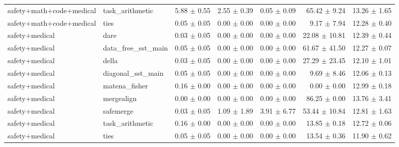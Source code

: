 \begin{table}[H]
{\begin{tabular}{llrrrrr}
safety+math+code+medical & task\_arithmetic & 5.88 $\pm$ 0.55 & 2.55 $\pm$ 0.39 & 0.05 $\pm$ 0.09 & 65.42 $\pm$ 9.24 & 13.26 $\pm$ 1.65 \\
safety+math+code+medical & ties & 0.05 $\pm$ 0.05 & 0.00 $\pm$ 0.00 & 0.00 $\pm$ 0.00 & 9.17 $\pm$ 7.94 & 12.28 $\pm$ 0.40 \\
safety+medical & dare & 0.03 $\pm$ 0.05 & 0.00 $\pm$ 0.00 & 0.00 $\pm$ 0.00 & 22.08 $\pm$ 10.81 & 12.39 $\pm$ 0.44 \\
safety+medical & data\_free\_sst\_main & 0.05 $\pm$ 0.05 & 0.00 $\pm$ 0.00 & 0.00 $\pm$ 0.00 & 61.67 $\pm$ 41.50 & 12.27 $\pm$ 0.07 \\
safety+medical & della & 0.03 $\pm$ 0.05 & 0.00 $\pm$ 0.00 & 0.00 $\pm$ 0.00 & 27.29 $\pm$ 23.45 & 12.10 $\pm$ 1.01 \\
safety+medical & diagonal\_sst\_main & 0.05 $\pm$ 0.05 & 0.00 $\pm$ 0.00 & 0.00 $\pm$ 0.00 & 9.69 $\pm$ 8.46 & 12.06 $\pm$ 0.13 \\
safety+medical & matena\_fisher & 0.16 $\pm$ 0.00 & 0.00 $\pm$ 0.00 & 0.00 $\pm$ 0.00 & 0.00 $\pm$ 0.00 & 12.99 $\pm$ 0.18 \\
safety+medical & mergealign & 0.00 $\pm$ 0.00 & 0.00 $\pm$ 0.00 & 0.00 $\pm$ 0.00 & 86.25 $\pm$ 0.00 & 13.76 $\pm$ 3.41 \\
safety+medical & safemerge & 0.03 $\pm$ 0.05 & 1.09 $\pm$ 1.89 & 3.91 $\pm$ 6.77 & 53.44 $\pm$ 10.84 & 12.81 $\pm$ 1.63 \\
safety+medical & task\_arithmetic & 0.16 $\pm$ 0.00 & 0.00 $\pm$ 0.00 & 0.00 $\pm$ 0.00 & 13.85 $\pm$ 0.18 & 12.72 $\pm$ 0.06 \\
safety+medical & ties & 0.05 $\pm$ 0.05 & 0.00 $\pm$ 0.00 & 0.00 $\pm$ 0.00 & 13.54 $\pm$ 0.36 & 11.90 $\pm$ 0.62 \\
\bottomrule
\end{tabular}
}
\end{table}

\begin{table}[H]
\centering
\caption{崩壊分析: safety+math条件におけるSST-Merge(GSM8K対象)の詳細指標と偽の安全性}
\label{tab:evaluation_yobi_main_GSM8K}
\small
{}
\end{table}

